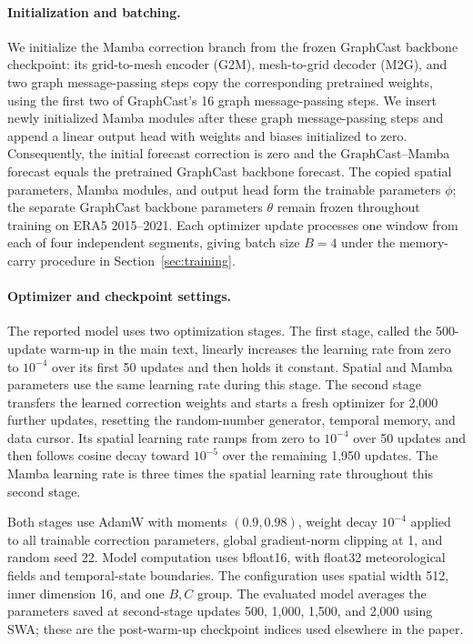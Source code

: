 \documentclass[11pt]{article}
\begin{document}
\paragraph{Initialization and batching.}
We initialize the Mamba correction branch from the frozen GraphCast backbone checkpoint: its grid-to-mesh encoder (G2M), mesh-to-grid decoder (M2G), and two graph message-passing steps copy the corresponding pretrained weights, using the first two of GraphCast's 16 graph message-passing steps. We insert newly initialized Mamba modules after these graph message-passing steps and append a linear output head with weights and biases initialized to zero. Consequently, the initial forecast correction is zero and the GraphCast--Mamba forecast equals the pretrained GraphCast backbone forecast. The copied spatial parameters, Mamba modules, and output head form the trainable parameters $\phi$; the separate GraphCast backbone parameters $\theta$ remain frozen throughout training on ERA5 2015--2021. Each optimizer update processes one window from each of four independent segments, giving batch size $B=4$ under the memory-carry procedure in Section~\ref{sec:training}.

\paragraph{Optimizer and checkpoint settings.}

The reported model uses two optimization stages. The first stage, called the 500-update warm-up in the main text, linearly increases the learning rate from zero to $10^{-4}$ over its first 50 updates and then holds it constant. Spatial and Mamba parameters use the same learning rate during this stage. The second stage transfers the learned correction weights and starts a fresh optimizer for 2,000 further updates, resetting the random-number generator, temporal memory, and data cursor. Its spatial learning rate ramps from zero to $10^{-4}$ over 50 updates and then follows cosine decay toward $10^{-5}$ over the remaining 1,950 updates. The Mamba learning rate is three times the spatial learning rate throughout this second stage.

Both stages use AdamW with moments $(0.9,0.98)$, weight decay $10^{-4}$ applied to all trainable correction parameters, global gradient-norm clipping at 1, and random seed 22. Model computation uses bfloat16, with float32 meteorological fields and temporal-state boundaries. The configuration uses spatial width 512, inner dimension 16, and one $B,C$ group. The evaluated model averages the parameters saved at second-stage updates 500, 1,000, 1,500, and 2,000 using SWA; these are the post-warm-up checkpoint indices used elsewhere in the paper.
\end{document}
